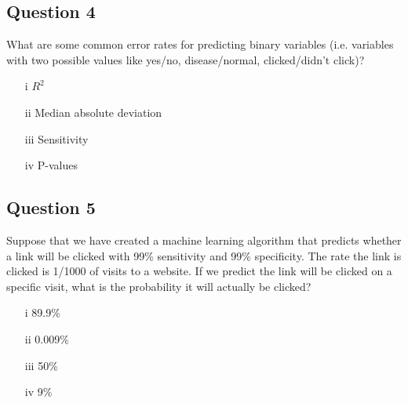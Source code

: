 \documentclass[DSS8main.tex]{subfiles}
\begin{document}
\subsection*{Question 4}
What are some common error rates for predicting binary variables (i.e. variables with two possible values like yes/no, disease/normal, clicked/didn't click)?
\begin{itemize}
\item[i] $R^2$
\item[ii] Median absolute deviation
\item[iii] Sensitivity
\item[iv] P-values
\end{itemize}
\subsection*{Question 5}
Suppose that we have created a machine learning algorithm that predicts whether a link will be clicked with 99\% sensitivity and 99\% specificity. The rate the link is clicked is 1/1000 of visits to a website. If we predict the link will be clicked on a specific visit, what is the probability it will actually be clicked?

\begin{itemize}
\item[i] 89.9\%
\item[ii] 0.009\%
\item[iii] 50\%
\item[iv] 9\%
\end{itemize}
\end{document}

